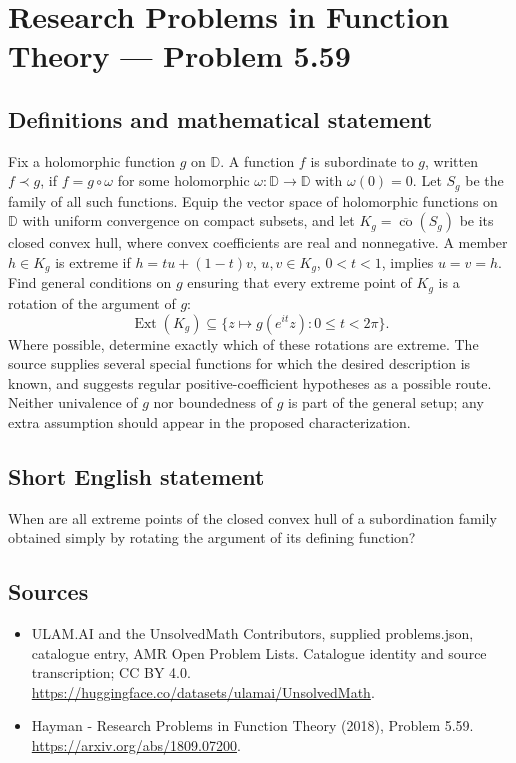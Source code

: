 \documentclass[11pt,a4paper]{article}
\begin{document}
\section*{Research Problems in Function Theory — Problem 5.59}\label{statement}

\subsection{Definitions and mathematical statement}
Fix a holomorphic function $g$ on $\mathbb D$. A function $f$ is subordinate to $g$, written $f\prec g$, if $f=g\circ\omega$ for some holomorphic $\omega:\mathbb D\to\mathbb D$ with $\omega(0)=0$. Let $S_g$ be the family of all such functions.
Equip the vector space of holomorphic functions on $\mathbb D$ with uniform convergence on compact subsets, and let
$K_g=\overline{\operatorname{co}}(S_g)$ be its closed convex hull, where convex coefficients are real and nonnegative. A member $h\in K_g$ is extreme if
$h=tu+(1-t)v$, $u,v\in K_g$, $0<t<1$, implies $u=v=h$.
Find general conditions on $g$ ensuring that every extreme point of $K_g$ is a rotation of the argument of $g$:
\[
\operatorname{Ext}(K_g)\subseteq
\{z\mapsto g(e^{it}z):0\le t<2\pi\}.
\]
Where possible, determine exactly which of these rotations are extreme. The source supplies several special functions for which the desired description is known, and suggests regular positive-coefficient hypotheses as a possible route. Neither univalence of $g$ nor boundedness of $g$ is part of the general setup; any extra assumption should appear in the proposed characterization.
\subsection{Short English statement}
When are all extreme points of the closed convex hull of a subordination family obtained simply by rotating the argument of its defining function?
\subsection{Sources}
\begin{itemize}
\item[S1] ULAM.AI and the UnsolvedMath Contributors, supplied problems.json, catalogue entry, AMR Open Problem Lists. Catalogue identity and source transcription; CC BY 4.0.
\url{https://huggingface.co/datasets/ulamai/UnsolvedMath}.
\item[S2] Hayman - Research Problems in Function Theory (2018), Problem 5.59. 
\url{https://arxiv.org/abs/1809.07200}.
\end{itemize}
\end{document}
